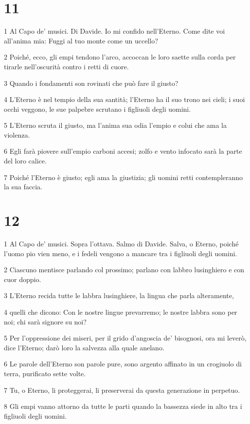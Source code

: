 \chapter{11}

\par 1 Al Capo de' musici. Di Davide. Io mi confido nell'Eterno. Come dite voi all'anima mia: Fuggi al tuo monte come un uccello?
\par 2 Poiché, ecco, gli empi tendono l'arco, accoccan le loro saette sulla corda per tirarle nell'oscurità contro i retti di cuore.
\par 3 Quando i fondamenti son rovinati che può fare il giusto?
\par 4 L'Eterno è nel tempio della sua santità; l'Eterno ha il suo trono nei cieli; i suoi occhi veggono, le sue palpebre scrutano i figliuoli degli uomini.
\par 5 L'Eterno scruta il giusto, ma l'anima sua odia l'empio e colui che ama la violenza.
\par 6 Egli farà piovere sull'empio carboni accesi; zolfo e vento infocato sarà la parte del loro calice.
\par 7 Poiché l'Eterno è giusto; egli ama la giustizia; gli uomini retti contempleranno la sua faccia.

\chapter{12}

\par 1 Al Capo de' musici. Sopra l'ottava. Salmo di Davide. Salva, o Eterno, poiché l'uomo pio vien meno, e i fedeli vengono a mancare tra i figliuoli degli uomini.
\par 2 Ciascuno mentisce parlando col prossimo; parlano con labbro lusinghiero e con cuor doppio.
\par 3 L'Eterno recida tutte le labbra lusinghiere, la lingua che parla alteramente,
\par 4 quelli che dicono: Con le nostre lingue prevarremo; le nostre labbra sono per noi; chi sarà signore su noi?
\par 5 Per l'oppressione dei miseri, per il grido d'angoscia de' bisognosi, ora mi leverò, dice l'Eterno; darò loro la salvezza alla quale anelano.
\par 6 Le parole dell'Eterno son parole pure, sono argento affinato in un crogiuolo di terra, purificato sette volte.
\par 7 Tu, o Eterno, li proteggerai, li preserverai da questa generazione in perpetuo.
\par 8 Gli empi vanno attorno da tutte le parti quando la bassezza siede in alto tra i figliuoli degli uomini.

